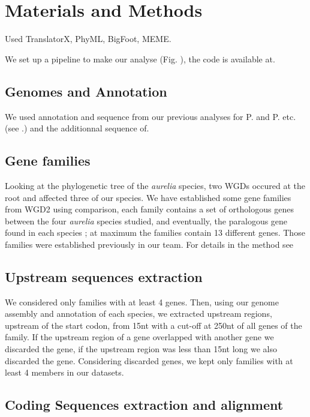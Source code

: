 \section*{Materials and Methods}

Used TranslatorX, PhyML, BigFoot, MEME.

We set up a pipeline to make our analyse (Fig. ), the code is available at.

\subsection*{Genomes and Annotation}

We used annotation and sequence from our previous analyses for P. and P. etc. (see .) and the additionnal sequence of.

\subsection*{Gene families}

Looking at the phylogenetic tree of the \textit{aurelia} species, two WGDs occured at the root and affected three of our species. We have established some gene families from WGD2 using comparison, each family contains a set of orthologous genes between the four \textit{aurelia} species studied, and eventually, the paralogous gene found in each species ; at maximum the families contain 13 different genes. Those families were established previously in our team. For details in the method see

\subsection*{Upstream sequences extraction}

We considered only families with at least 4 genes. Then, using our genome assembly and annotation of each species, we extracted upstream regions, upstream of the start codon, from 15nt with a cut-off at 250nt of all genes of the family. If the upstream region of a gene overlapped with another gene we discarded the gene, if the upstream region was less than 15nt long we also discarded the gene. Considering discarded genes, we kept only families with at least 4 members in our datasets.

\subsection*{Coding Sequences extraction and alignment}

